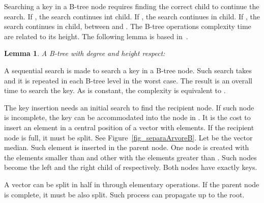 \documentclass[11pt]{article}
\newtheorem{lema}{Lemma}
\begin{document}
Searching a key  in a B-tree node requires finding the correct child  to continue the search. If , the search continues int  child. If , the search continues in  child. If , the search continues in  child, between  and . The B-tree operations complexity time are related to its height. The following lemma is based in~\cite{cormen}.







\begin{lema}
A B-tree with degree   and height  respect:




\end{lema}




A sequential search is made to search a key  in a B-tree node. Such search takes  and it is repeated in each B-tree level in the worst case. The result is an  overall time to search the key. As  is constant, the complexity is equivalent to .





The key insertion needs an initial search to find the recipient node. If such node is incomplete, the key can be accommodated into the node in . It is the cost to insert an element in a central position of a vector with  elements. If the recipient node is full, it must be split. See Figure~\ref{fig_separaArvoreB}.  Let  be the vector median. Such element is inserted in the parent node. One node is created with the elements smaller than  and other with the elements greater than . Such nodes become the left and the right child of  respectively. Both nodes have exactly  keys.



A vector can be split in half in  through elementary operations. If the parent node is complete, it must be also split. Such process can propagate up to the root.
\end{document}
